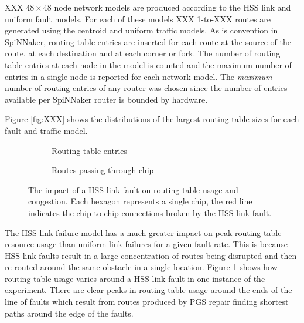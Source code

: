 			XXX $48\times48$ node network models are produced according to the HSS
			link and uniform fault models. For each of these models XXX 1-to-XXX
			routes are generated using the centroid and uniform traffic models.  As
			is convention in SpiNNaker, routing table entries are inserted for each
			route at the source of the route, at each destination and at each corner
			or fork. The number of routing table entries at each node in the model is
			counted and the maximum number of entries in a single node is reported
			for each network model.  The \emph{maximum} number of routing entries of
			any router was chosen since the number of entries available per SpiNNaker
			router is bounded by hardware.
			
			Figure \ref{fig:XXX} shows the distributions of the largest routing table
			sizes for each fault and traffic model.
			
			\begin{figure}
				\center
				\begin{subfigure}{0.48\linewidth}
					\center
					
					\caption{Routing table entries}
					\label{fig:hss-link-routing-table-usage}
				\end{subfigure}
				\begin{subfigure}{0.48\linewidth}
					\center
					
					\caption{Routes passing through chip}
					\label{fig:hss-link-resource-usage}
				\end{subfigure}
				
				\caption{The impact of a HSS link fault on routing table usage and
				congestion. Each hexagon represents a single chip, the red line
				indicates the chip-to-chip connections broken by the HSS link fault.}
				\label{fig:hss-link-usage}
			\end{figure}
			
			The HSS link failure model has a much greater impact on peak routing
			table resource usage than uniform link failures for a given fault rate.
			This is because HSS link faults result in a large concentration of routes
			being disrupted and then re-routed around the same obstacle in a single
			location. Figure \ref{fig:hss-link-routing-table-usage} shows how routing
			table usage varies around a HSS link fault in one instance of the
			experiment. There are clear peaks in routing table usage around the ends
			of the line of faults which result from routes produced by PGS repair
			finding shortest paths around the edge of the faults.
		
